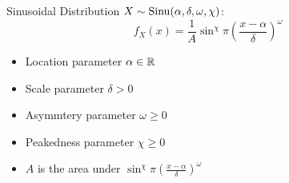 \begin{frame}{Sinusoidal Distribution}
    $X \sim \mathrm{Sinu}(\alpha, \delta, \omega, \chi)$:
    $$f_X (x) = \frac{1}{A} \sin^\chi \pi \left( \frac{x-\alpha}{\delta} \right)^\omega$$
\begin{itemize}
    \item Location parameter $\alpha \in \mathbb R$
    \item Scale parameter $\delta>0$
    \item Asymmtery parameter $\omega \geq 0$
    \item Peakedness parameter $\chi \geq 0$
    \item $A$ is the area under $\sin^\chi {\pi (\frac{x-\alpha}{\delta})^\omega}$
\end{itemize}
\end{frame}